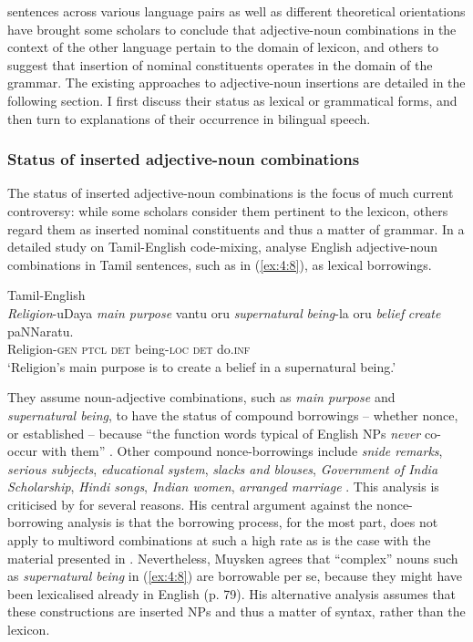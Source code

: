 sentences across various language pairs as well as different theoretical orientations have brought some scholars to conclude that adjective-noun combinations in the context of the other language pertain to the domain of  lexicon, and others to suggest that insertion of nominal constituents operates in the domain of the grammar. The existing approaches to adjective-noun insertions are detailed in the following section. I first discuss their status as lexical or grammatical forms, and then turn to explanations of their occurrence in bilingual speech.

\subsubsection{Status of inserted adjective-noun combinations}
The status of inserted adjective-noun combinations is the focus of much current controversy: while some scholars consider them pertinent to the lexicon, others regard them as inserted nominal constituents and thus a matter of grammar. In a detailed study on Tamil-English code-mixing, \citet{sankoff-et-al-1990} analyse English adjective-noun combinations in Tamil sentences, such as in (\ref{ex:4:8}), as lexical borrowings.

\ea{\label{ex:4:8}}
Tamil-English \citep[96]{sankoff-et-al-1990}\\
\gll \textit{Religion}-uDaya \textit{main purpose} vantu oru \textit{supernatural} \textit{being}-la oru \textit{belief} \textit{create} paNNaratu.\\
	\textcolor[rgb]{1,1,1}{Religion}-\textsc{gen} {} \textsc{ptcl} \textsc{det} {} \textcolor[rgb]{1,1,1}{being}-\textsc{loc} \textsc{det} {} {} do.\textsc{inf}\\
\glt `Religion's main purpose is to create a belief in a supernatural being.'
\z

\noindent They assume noun-adjective combinations, such as \textit{main purpose} and \textit{supernatural being}, to have the status of compound borrowings -- whether nonce, or established -- because ``the function words typical of English NPs \textit{never} co-occur with them'' \citep[80, emphasis in the original]{sankoff-et-al-1990}. Other compound nonce-borrowings include \textit{snide remarks}, \textit{serious subjects}, \textit{educational system}, \textit{slacks and blouses}, \textit{Government of India Scholarship}, \textit{Hindi songs}, \textit{Indian women}, \textit{arranged marriage} \citep[80, passim]{sankoff-et-al-1990}. This analysis is criticised by \citet[78--81]{muysken-bilingual-2000} for several reasons. His central argument against the nonce-borrowing analysis is that the borrowing process, for the most part, does not apply to multiword combinations at such a high rate as is the case with the material presented in \citet{sankoff-et-al-1990}. Nevertheless, Muysken agrees that ``complex'' nouns such as \textit{supernatural being} in (\ref{ex:4:8}) are borrowable per se, because they might have been lexicalised already in English (p. 79). His alternative  analysis assumes that these constructions are inserted NPs and thus a matter of syntax, rather than the lexicon.

